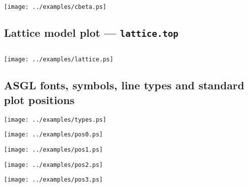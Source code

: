 \vspace{0.4cm}

\begin{verbatim}

\end{verbatim}

\vspace{0.4cm}
\texttt{[image: ../examples/cbeta.ps]}

\newpage

\subsection{Lattice model plot --- {\tt lattice.top}}

\vspace{1.0cm}

\begin{verbatim}

\end{verbatim}

\vspace{0.4cm}
\texttt{[image: ../examples/lattice.ps]}

\newpage


\subsection{{\sc ASGL} fonts, symbols, line types and standard plot positions}

\vspace{1cm}
\texttt{[image: ../examples/types.ps]}


\vspace{1cm}
\texttt{[image: ../examples/pos0.ps]}

\texttt{[image: ../examples/pos1.ps]}

\texttt{[image: ../examples/pos2.ps]}

\texttt{[image: ../examples/pos3.ps]}
